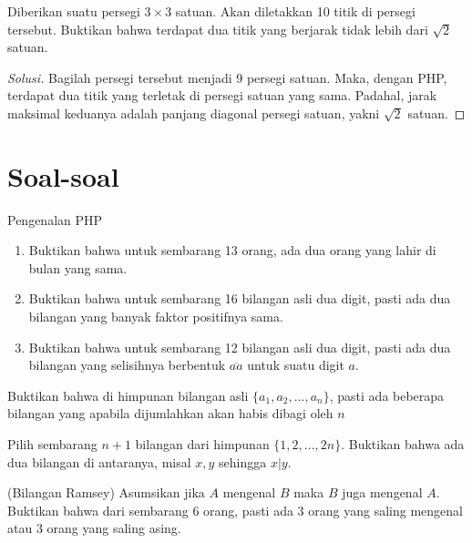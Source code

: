 \documentclass[11pt]{scrartcl}
\begin{document}
\begin{example}
    Diberikan suatu persegi $3 \times 3$ satuan. Akan diletakkan 10 titik di persegi tersebut. Buktikan bahwa terdapat dua titik yang berjarak tidak lebih dari $\sqrt{2}$ satuan.
\end{example}

\begin{proof}[Solusi]
    Bagilah persegi tersebut menjadi 9 persegi satuan. Maka, dengan PHP, terdapat dua titik yang terletak di persegi satuan yang sama. Padahal, jarak maksimal keduanya adalah panjang diagonal persegi satuan, yakni $\sqrt{2}$ satuan.
\end{proof}

\section{Soal-soal}
    \begin{problem}
        Pengenalan PHP
        \begin{enumerate}
            \item Buktikan bahwa untuk sembarang 13 orang, ada dua orang yang lahir di bulan yang sama.
            \item Buktikan bahwa untuk sembarang 16 bilangan asli dua digit, pasti ada dua bilangan yang banyak faktor positifnya sama.
            \item Buktikan bahwa untuk sembarang 12 bilangan asli dua digit, pasti ada dua bilangan yang selisihnya berbentuk $\overline{aa}$ untuk suatu digit $a$.
        \end{enumerate}
    \end{problem}

    \begin{problem}
        Buktikan bahwa di himpunan bilangan asli $\{a_1, a_2, ..., a_n\}$, pasti ada beberapa bilangan yang apabila dijumlahkan akan habis dibagi oleh $n$
    \end{problem}

    \begin{problem}
        Pilih sembarang $n + 1$ bilangan dari himpunan $\{1, 2, ..., 2n\}$. Buktikan bahwa ada dua bilangan di antaranya, misal $x,y$ sehingga $x|y$.
    \end{problem}
    
    \begin{problem}
        (Bilangan Ramsey) Asumsikan jika $A$ mengenal $B$ maka $B$ juga mengenal $A$. Buktikan bahwa dari sembarang $6$ orang, pasti ada 3 orang yang saling mengenal atau 3 orang yang saling asing.
    \end{problem}
\end{document}
